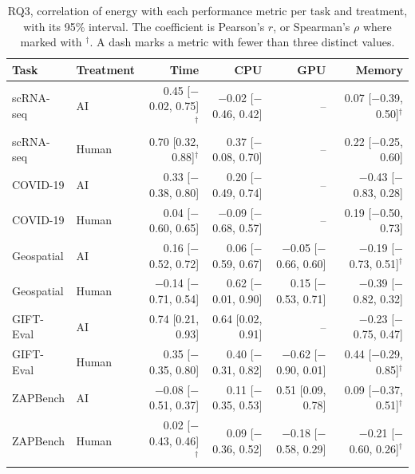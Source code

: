 \begin{table}[ht]
\centering
\caption{RQ3, correlation of energy with each performance metric per task and treatment, with its 95\% interval. The coefficient is Pearson's $r$, or Spearman's $\rho$ where marked with $^\dagger$. A dash marks a metric with fewer than three distinct values.} 
\label{tab:06_rq3_correlations}
\begingroup\small
\begin{tabular}{llrrrr}
  \toprule
Task & Treatment & Time & CPU & GPU & Memory \\ 
  \midrule
scRNA-seq & AI & 0.45 [$-$0.02, 0.75]$^\dagger$ & $-$0.02 [$-$0.46, 0.42] & – & 0.07 [$-$0.39, 0.50]$^\dagger$ \\ 
  scRNA-seq & Human & 0.70 [0.32, 0.88]$^\dagger$ & 0.37 [$-$0.08, 0.70] & – & 0.22 [$-$0.25, 0.60] \\ 
  COVID-19 & AI & 0.33 [$-$0.38, 0.80] & 0.20 [$-$0.49, 0.74] & – & $-$0.43 [$-$0.83, 0.28] \\ 
  COVID-19 & Human & 0.04 [$-$0.60, 0.65] & $-$0.09 [$-$0.68, 0.57] & – & 0.19 [$-$0.50, 0.73] \\ 
  Geospatial & AI & 0.16 [$-$0.52, 0.72] & 0.06 [$-$0.59, 0.67] & $-$0.05 [$-$0.66, 0.60] & $-$0.19 [$-$0.73, 0.51]$^\dagger$ \\ 
  Geospatial & Human & $-$0.14 [$-$0.71, 0.54] & 0.62 [$-$0.01, 0.90] & 0.15 [$-$0.53, 0.71] & $-$0.39 [$-$0.82, 0.32] \\ 
  GIFT-Eval & AI & 0.74 [0.21, 0.93] & 0.64 [0.02, 0.91] & – & $-$0.23 [$-$0.75, 0.47] \\ 
  GIFT-Eval & Human & 0.35 [$-$0.35, 0.80] & 0.40 [$-$0.31, 0.82] & $-$0.62 [$-$0.90, 0.01] & 0.44 [$-$0.29, 0.85]$^\dagger$ \\ 
  ZAPBench & AI & $-$0.08 [$-$0.51, 0.37] & 0.11 [$-$0.35, 0.53] & 0.51 [0.09, 0.78] & 0.09 [$-$0.37, 0.51]$^\dagger$ \\ 
  ZAPBench & Human & 0.02 [$-$0.43, 0.46]$^\dagger$ & 0.09 [$-$0.36, 0.52] & $-$0.18 [$-$0.58, 0.29] & $-$0.21 [$-$0.60, 0.26]$^\dagger$ \\ 
   \bottomrule
\end{tabular}
\endgroup
\end{table}
